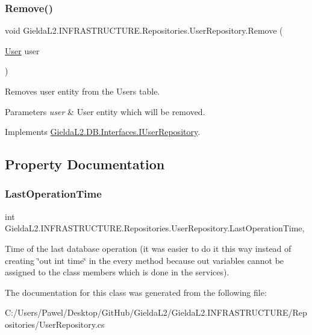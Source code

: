 \subsubsection{\texorpdfstring{Remove()}{Remove()}}
{\footnotesize\ttfamily void Gielda\+L2.\+I\+N\+F\+R\+A\+S\+T\+R\+U\+C\+T\+U\+R\+E.\+Repositories.\+User\+Repository.\+Remove (\begin{DoxyParamCaption}\item[{\mbox{\hyperlink{class_gielda_l2_1_1_d_b_1_1_entities_1_1_user}{User}}}]{user }\end{DoxyParamCaption})}



Removes user entity from the Users table. 


\begin{DoxyParams}{Parameters}
{\em user} & User entity which will be removed.\\
\hline
\end{DoxyParams}


Implements \mbox{\hyperlink{interface_gielda_l2_1_1_d_b_1_1_interfaces_1_1_i_user_repository_ad353a86a583d55065532459823c413f2}{Gielda\+L2.\+D\+B.\+Interfaces.\+I\+User\+Repository}}.



\subsection{Property Documentation}
\mbox{\label{class_gielda_l2_1_1_i_n_f_r_a_s_t_r_u_c_t_u_r_e_1_1_repositories_1_1_user_repository_aec266d4cd489b911934e5317390c3cc4}} 
\subsubsection{\texorpdfstring{LastOperationTime}{LastOperationTime}}
{\footnotesize\ttfamily int Gielda\+L2.\+I\+N\+F\+R\+A\+S\+T\+R\+U\+C\+T\+U\+R\+E.\+Repositories.\+User\+Repository.\+Last\+Operation\+Time\hspace{0.3cm}{\ttfamily [get]}, {\ttfamily [set]}}



Time of the last database operation (it was easier to do it this way instead of creating \char`\"{}out int time\char`\"{} in the every method because out variables cannot be assigned to the class members which is done in the services). 



The documentation for this class was generated from the following file\+:\begin{DoxyCompactItemize}
\item 
C\+:/\+Users/\+Pawel/\+Desktop/\+Git\+Hub/\+Gielda\+L2/\+Gielda\+L2.\+I\+N\+F\+R\+A\+S\+T\+R\+U\+C\+T\+U\+R\+E/\+Repositories/User\+Repository.\+cs\end{DoxyCompactItemize}
